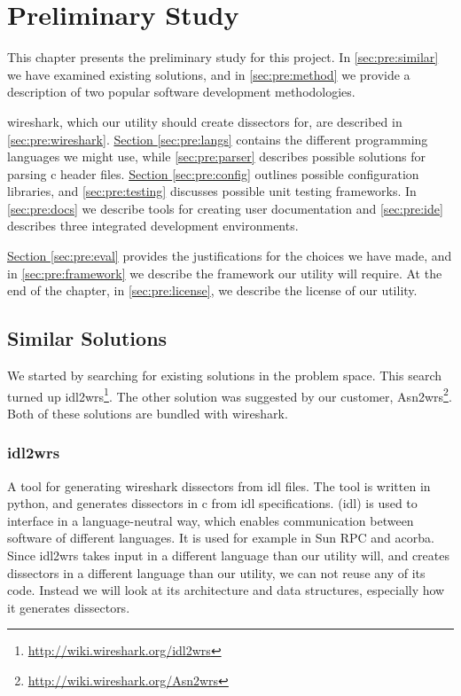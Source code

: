 \chapter{Preliminary Study}
This chapter presents the preliminary study for this project.
In \autoref{sec:pre:similar} we have examined existing solutions, and in
\autoref{sec:pre:method} we provide a description of two popular software
development methodologies.

\Gls{wireshark}, which our \gls{utility} should create \glspl{dissector} for, are described in
\autoref{sec:pre:wireshark}.
\hyperref[sec:pre:langs]{Section \ref*{sec:pre:langs}} contains the different
programming languages we might use, while \autoref{sec:pre:parser}
describes possible solutions for parsing \Gls{c} \gls{header} files.
\hyperref[sec:pre:config]{Section \ref*{sec:pre:config}} outlines possible
configuration libraries, and \autoref{sec:pre:testing} discusses possible unit
testing frameworks. In \autoref{sec:pre:docs} we describe tools for creating
user documentation and \autoref{sec:pre:ide} describes three integrated
development environments.

\hyperref[sec:pre:eval]{Section \ref*{sec:pre:eval}} provides the
justifications for the choices we have made, and in
\autoref{sec:pre:framework} we describe the framework our \gls{utility} will require.
At the end of the chapter, in \autoref{sec:pre:license}, we describe the
license of our \gls{utility}.


\section{Similar Solutions}
\label{sec:pre:similar}
We started by searching for existing solutions in the problem space. This
search turned up idl2wrs\footnote{\url{http://wiki.wireshark.org/idl2wrs}}.
The other solution was suggested by our customer,
Asn2wrs\footnote{\url{http://wiki.wireshark.org/Asn2wrs}}.
Both of these solutions are bundled with \Gls{wireshark}.

\subsection{idl2wrs}
A tool for generating \Gls{wireshark} \glspl{dissector} from \gls{idl} files. The tool is written
in \Gls{python}, and generates \glspl{dissector} in \Gls{c} from \gls{idl} specifications. (\gls{idl})
is used to interface in a language-neutral way, which enables communication between software
of different languages. It is used for example in \gls{Sun RPC} and \gls{acorba}. 
Since idl2wrs takes input in a different language than our \gls{utility} will, and creates \glspl{dissector}
in a different language than our \gls{utility}, we can not reuse any of its code. Instead we will look
at its architecture and data structures, especially how it generates \glspl{dissector}.

